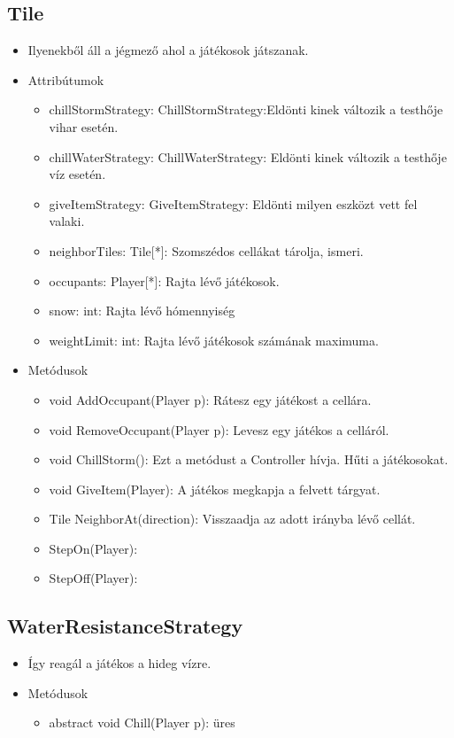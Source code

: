 \subsection{Tile}
\begin{itemize}
	\item Ilyenekből áll a jégmező ahol a játékosok játszanak.\\
\item Attribútumok
\begin{itemize}
	\item chillStormStrategy: ChillStormStrategy:Eldönti kinek változik a testhője vihar esetén.
	\item chillWaterStrategy: ChillWaterStrategy: Eldönti kinek változik a testhője víz esetén.
	\item giveItemStrategy: GiveItemStrategy: Eldönti milyen eszközt vett fel valaki.
	\item neighborTiles: Tile[*]: Szomszédos cellákat tárolja, ismeri.
	\item occupants: Player[*]: Rajta lévő játékosok.
	\item snow: int: Rajta lévő hómennyiség
	\item weightLimit: int: Rajta lévő játékosok számának maximuma.
	
\end{itemize}
\item Metódusok
\begin{itemize}
	\item void AddOccupant(Player p): Rátesz egy játékost a cellára.
	\item void RemoveOccupant(Player p): Levesz egy játékos a celláról.
	\item void ChillStorm(): Ezt a metódust a Controller hívja. Hűti a játékosokat.
	\item void GiveItem(Player): A játékos megkapja a felvett tárgyat.
	\item Tile NeighborAt(direction): Visszaadja az adott irányba lévő cellát.
	\item StepOn(Player):
	\item StepOff(Player):
\end{itemize}
\end{itemize}

\subsection{WaterResistanceStrategy}
\begin{itemize}
	\item Így reagál a játékos a hideg vízre.\\
\item Metódusok
\begin{itemize}
	\item abstract void Chill(Player p): üres
\end{itemize}
\end{itemize}

